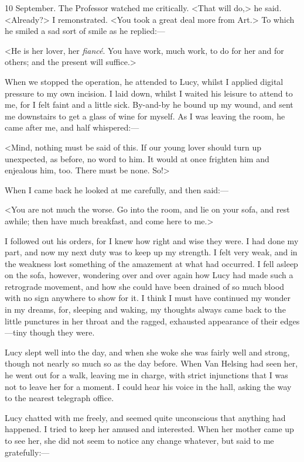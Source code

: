 \begin{diary}{10 September.}
The Professor watched me critically. <That will do,> he said. <Already?> I remonstrated. <You took a great deal more from Art.> To which he smiled a sad sort of smile as he replied:—

<He is her lover, her \textit{fiancé}. You have work, much work, to do for her and for others; and the present will suffice.>

When we stopped the operation, he attended to Lucy, whilst I applied digital pressure to my own incision. I laid down, whilst I waited his leisure to attend to me, for I felt faint and a little sick. By-and-by he bound up my wound, and sent me downstairs to get a glass of wine for myself. As I was leaving the room, he came after me, and half whispered:—

<Mind, nothing must be said of this. If our young lover should turn up unexpected, as before, no word to him. It would at once frighten him and enjealous him, too. There must be none. So!>

When I came back he looked at me carefully, and then said:—

<You are not much the worse. Go into the room, and lie on your sofa, and rest awhile; then have much breakfast, and come here to me.>

I followed out his orders, for I knew how right and wise they were. I had done my part, and now my next duty was to keep up my strength. I felt very weak, and in the weakness lost something of the amazement at what had occurred. I fell asleep on the sofa, however, wondering over and over again how Lucy had made such a retrograde movement, and how she could have been drained of so much blood with no sign anywhere to show for it. I think I must have continued my wonder in my dreams, for, sleeping and waking, my thoughts always came back to the little punctures in her throat and the ragged, exhausted appearance of their edges—tiny though they were.

Lucy slept well into the day, and when she woke she was fairly well and strong, though not nearly so much so as the day before. When Van Helsing had seen her, he went out for a walk, leaving me in charge, with strict injunctions that I was not to leave her for a moment. I could hear his voice in the hall, asking the way to the nearest telegraph office.

Lucy chatted with me freely, and seemed quite unconscious that anything had happened. I tried to keep her amused and interested. When her mother came up to see her, she did not seem to notice any change whatever, but said to me gratefully:—


\end{diary}
